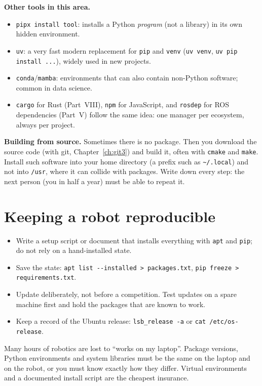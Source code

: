 \textbf{Other tools in this area.}
\begin{itemize}[nosep]
  \item \texttt{pipx install tool}: installs a Python \emph{program} (not a library) in its own hidden environment.
  \item \texttt{uv}: a very fast modern replacement for \texttt{pip} and \texttt{venv} (\verb|uv venv|, \verb|uv pip install ...|), widely used in new projects.
  \item \texttt{conda}/\texttt{mamba}: environments that can also contain non-Python software; common in data science.
  \item \texttt{cargo} for Rust (Part~VIII), \texttt{npm} for JavaScript, and \texttt{rosdep} for ROS dependencies (Part~V) follow the same idea: one manager per ecosystem, always per project.
\end{itemize}

\textbf{Building from source.} Sometimes there is no package. Then you download the source code (with git, Chapter~\ref{ch:git3}) and build it, often with \texttt{cmake} and \texttt{make}. Install such software into your home directory (a prefix such as \verb|~/.local|) and not into \texttt{/usr}, where it can collide with packages. Write down every step: the next person (you in half a year) must be able to repeat it.

\section*{Keeping a robot reproducible}
\begin{itemize}[nosep]
  \item Write a setup script or document that installs everything with \texttt{apt} and \texttt{pip}; do not rely on a hand-installed state.
  \item Save the state: \verb|apt list --installed > packages.txt|, \verb|pip freeze > requirements.txt|.
  \item Update deliberately, not before a competition. Test updates on a spare machine first and hold the packages that are known to work.
  \item Keep a record of the Ubuntu release: \verb|lsb_release -a| or \verb|cat /etc/os-release|.
\end{itemize}

\begin{aibox}
Many hours of robotics are lost to ``works on my laptop''. Package versions, Python environments and system libraries must be the same on the laptop and on the robot, or you must know exactly how they differ. Virtual environments and a documented install script are the cheapest insurance.
\end{aibox}

